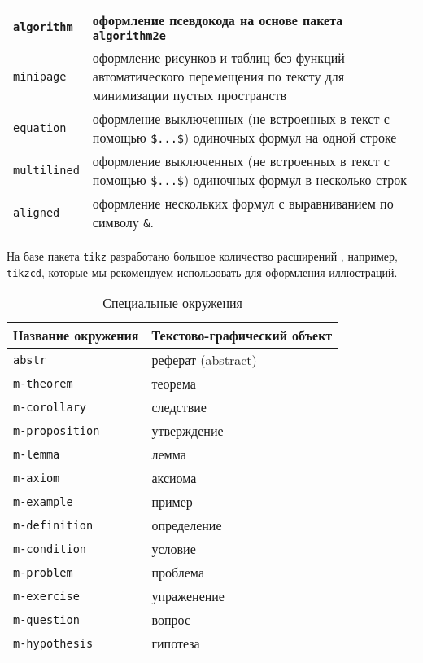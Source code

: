 \begin{table} [htbp]
\begin{Spacing}{\Single}
\begin{tabular}{|l|p{11cm}|}
			\verb|algorithm| &{оформление псевдокода на основе пакета \verb|algorithm2e| \cite{ctan-algorithm2e}} \\ \hline
			\verb|minipage| & {оформление рисунков и таблиц без функций автоматического перемещения по тексту для  минимизации пустых пространств} \\ \hline
			\verb|equation| & {оформление выключенных (не встроенных в текст с помощью \verb|$...$|) одиночных формул на одной строке} \\ \hline
			\verb|multilined| &{оформление выключенных (не встроенных в текст с помощью \verb|$...$|) одиночных формул в несколько строк} \\ \hline
			\verb|aligned| &{оформление нескольких формул с выравниванием по символу \verb|&|.} \\ \hline
	\end{tabular}
	\end{Spacing}
	\end{table}

На базе пакета \verb|tikz| разработано большое количество расширений \cite{ctan-tikz}, например, \verb|tikzcd|, которые мы рекомендуем использовать для оформления иллюстраций.

	\begin{table} [htbp]%
	\centering\small
	\caption{Специальные окружения}%
	\label{tab:enum-spbpu}
		\begin{tabular}{|l|l|}
			\hline
			Название окружения & Текстово-графический объект\\
			\hline
			\verb|abstr|	 & реферат (abstract) \\ \hline
			\verb|m-theorem| & теорема \\ \hline
			\verb|m-corollary| & следствие \\ \hline
			\verb|m-proposition| & утверждение \\ \hline
			\verb|m-lemma|   & лемма \\ \hline
			\verb|m-axiom| & аксиома \\ \hline
			\verb|m-example| & пример \\ \hline
			\verb|m-definition| &  определение \\ \hline
			\verb|m-condition| & условие \\ \hline
			\verb|m-problem| & проблема \\ \hline
			\verb|m-exercise| & упраженение \\ \hline
			\verb|m-question| & вопрос \\ \hline
			\verb|m-hypothesis| & гипотеза \\ \hline
		\end{tabular}
	\normalsize
\end{table}

